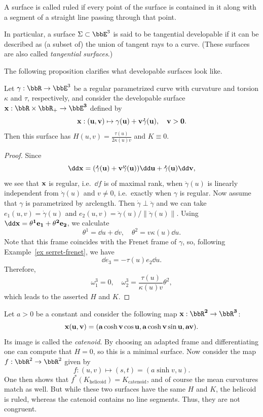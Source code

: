 \begin{defn}
    A surface is called ruled if every point of the surface is contained in it along with a segment of a straight line passing through that point.

    In particular, a surface $\Sigma\subset\bbE^3$ is said to be tangential developable if it can be described as (a subset of) the union of tangent rays to a curve. (These surfaces are also called \emph{tangential surfaces}.)
\end{defn}
The following proposition clarifies what developable surfaces look like.
\begin{prop}
    Let $\gamma:\bbR\to \bbE^3$ be a regular parametrized curve with curvature and torsion $\kappa$ and $\tau$, respectively, and consider the developable surface $\bf{x}:\bbR\times \bbR_+\to \bbE^3$ defined by 
    \[\bf{x}:(u,v)\mapsto \gamma(u)+v\dot\gamma(u),\quad v>0.\]
    Then this surface has $H(u,v)=\frac{\tau(u)}{2\kappa(u)v}$ and $K\equiv 0$.
\end{prop}
\begin{proof}
    Since 
    \[\dd \bf{x}=(\dot\gamma(u)+v\ddot\gamma(u))\dd u+\dot\gamma(u)\dd v,\]
    we see that $\bf{x}$ is regular, i.e.\ $\dd f$ is of maximal rank, when $\ddot \gamma(u)$ is linearly independent from $\dot\gamma(u)$ and $v\neq 0$, i.e.\ exactly when $\gamma$ is regular. Now assume that $\gamma$ is parametrized by arclength. Then $\dot\gamma\perp\ddot\gamma$ and we can take $e_1(u,v)=\dot\gamma(u)$ and $e_2(u,v)=\ddot\gamma(u)/\lVert\ddot\gamma(u)\rVert$. Using $\dd \bf{x}=\theta^1e_1+\theta^2e_2$, we calculate 
    \[\theta^1=\dd u+\dd v,\quad \theta^2=v\kappa(u)\dd u.\]
    Note that this frame coincides with the Frenet frame of $\gamma$, so, following Example~\ref{ex serret-frenet}, we have 
    \[\dd e_3=-\tau(u)e_2\dd u.\]
    Therefore, 
    \[\omega_1^3=0,\quad \omega_2^3=\frac{\tau(u)}{\kappa(u)v}\theta^2,\]
    which leads to the asserted $H$ and $K$.
\end{proof}


\begin{example}[Catenoid]
    Let $a>0$ be a constant and consider the following map $\bf{x}:\bbR^2\to \bbR^3$:
    \[\bf{x}(u,v)=(a\cosh v\cos u,a\cosh v\sin u,av).\]
    Its image is called the \emph{catenoid}.
    By choosing an adapted frame and differentiating one can compute that $H=0$, so this is a minimal surface. Now consider the map $f:\bbR^2\to \bbR^2$ given by
    \[f: (u,v)\mapsto (s,t)=(a\sinh v,u).\]
    One then shows that $f^\ast(K_{\mathrm{helicoid}})=K_{\mathrm{catenoid}}$, and of course the mean curvatures match as well. But while these two surfaces have the same $H$ and $K$, the helicoid is ruled, whereas the catenoid contains no line segments. Thus, they are not congruent.
\end{example}

